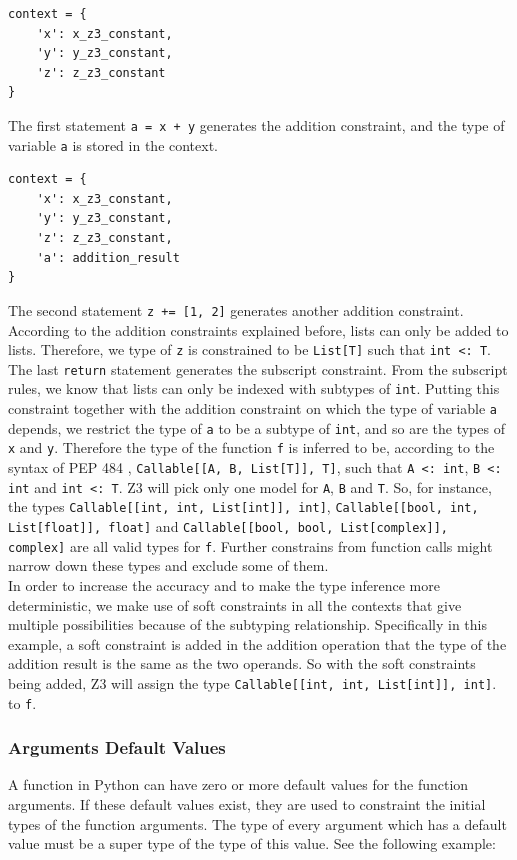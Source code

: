 \begin{lstlisting}
context = {
	'x': x_z3_constant,
	'y': y_z3_constant,
	'z': z_z3_constant
}
\end{lstlisting}
The first statement \lstinline|a = x + y| generates the addition constraint, and the type of variable \lstinline|a| is stored in the context.
\begin{lstlisting}
context = {
	'x': x_z3_constant,
	'y': y_z3_constant,
	'z': z_z3_constant,
	'a': addition_result
}
\end{lstlisting}
The second statement \lstinline|z += [1, 2]| generates another addition constraint. According to the addition constraints explained before, lists can only be added to lists. Therefore, we type of \lstinline|z| is constrained to be \lstinline|List[T]| such that \lstinline|int <: T|. The last \lstinline|return| statement generates the subscript constraint. From the subscript rules, we know that lists can only be indexed with subtypes of \lstinline|int|. Putting this constraint together with the addition constraint on which the type of variable \lstinline|a| depends, we restrict the type of \lstinline|a| to be a subtype of \lstinline|int|, and so are the types of \lstinline|x| and \lstinline|y|. Therefore the type of the function \lstinline|f| is inferred to be, according to the syntax of PEP 484 \cite{484}, \lstinline|Callable[[A, B, List[T]], T]|, such that \lstinline|A <: int|, \lstinline|B <: int| and \lstinline|int <: T|. Z3 will pick only one model for \lstinline|A|, \lstinline|B| and \lstinline|T|. So, for instance, the types \lstinline|Callable[[int, int, List[int]], int]|, \lstinline|Callable[[bool, int, List[float]], float]| and \lstinline|Callable[[bool, bool, List[complex]], complex]| are all valid types for \lstinline|f|. Further constrains from function calls might narrow down these types and exclude some of them.\\

In order to increase the accuracy and to make the type inference more deterministic, we make use of soft constraints in all the contexts that give multiple possibilities because of the subtyping relationship. Specifically in this example, a soft constraint is added in the  addition operation that the type of the addition result is the same as the two operands. So with the soft constraints being added, Z3 will assign the type \lstinline|Callable[[int, int, List[int]], int]|. to \lstinline|f|.

\subsubsection{Arguments Default Values}
A function in Python can have zero or more default values for the function arguments. If these default values exist, they are used to constraint the initial types of the function arguments. The type of every argument which has a default value must be a super type of the type of this value. See the following example:

